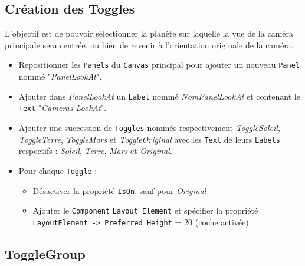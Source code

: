 \documentclass[a4paper,10pt]{article}
\newenvironment{solution}%
{\begin{tcolorbox}[breakable,colback=red!5!white,colframe=red!75!black,title=Solution]}%
{\end{tcolorbox}}
\begin{document}
\begin{solution}

\subsection{Création des Toggles}

L'objectif est de pouvoir sélectionner la planète sur laquelle la vue de la caméra principale sera centrée, ou bien de revenir à l'orientation originale de la caméra.

\begin{itemize}
	\item Repositionner les \texttt{Panels} du \texttt{Canvas} principal pour ajouter un nouveau \texttt{Panel} nommé "\textit{PanelLookAt}".
	\item Ajouter dans  \textit{PanelLookAt} un \texttt{Label} nommé \textit{NomPanelLookAt} et contenant le \texttt{Text} "\textit{Cameras LookAt}".
	\item Ajouter une succession de \texttt{Toggles} nommés respectivement \textit{ToggleSoleil}, \textit{ToggleTerre}, \textit{ToggleMars} et \textit{ToggleOriginal} avec les \texttt{Text} de leurs \texttt{Labels} respectifs : \textit{Soleil}, \textit{Terre}, \textit{Mars} et \textit{Original}.
	\item Pour chaque \texttt{Toggle} :
	\begin{itemize}
		\item 	Désactiver la propriété \texttt{IsOn}, sauf pour \textit{Original}
		\item  Ajouter le \texttt{Component} \texttt{Layout Element} et spécifier la propriété \texttt{LayoutElement -> Preferred Height} = $20$ (coche activée).		
	\end{itemize}	
\end{itemize}

\subsection{ToggleGroup}


\end{solution}
\end{document}
